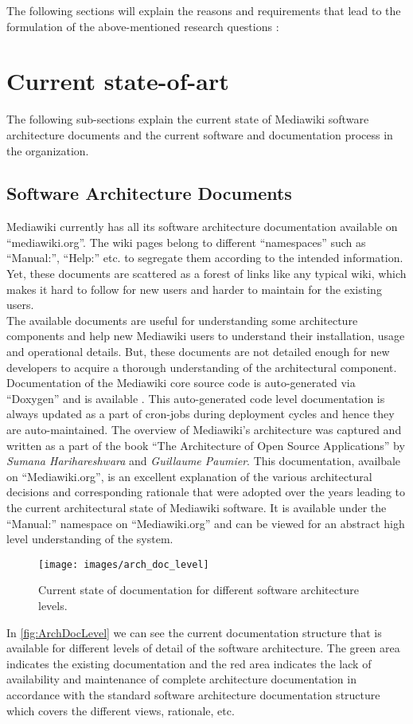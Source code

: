 The following sections will explain the reasons and requirements that lead to the formulation of the above-mentioned research questions : 
 
\section{Current state-of-art}\label{CurrentSOA} 
\indent The following sub-sections explain the current state of Mediawiki software architecture documents and the current software and documentation process in the organization.
\subsection{Software Architecture Documents}
\indent Mediawiki currently has all its software architecture documentation available on \enquote{mediawiki.org}. The wiki pages belong to different \enquote{namespaces} such as \enquote{Manual:}, \enquote{Help:} etc. to segregate them according to the intended information. Yet, these documents are scattered as a forest of links like any typical wiki, which makes it hard to follow for new users and harder to maintain for the existing users. 
\\\indent The available documents are useful for understanding some architecture components and help new Mediawiki users to understand their installation, usage and operational details. But, these documents are not detailed enough for new developers to acquire a thorough understanding of the architectural component.  Documentation of the Mediawiki core source code is auto-generated via \enquote{Doxygen} and is available \cite{mw_core}. This auto-generated code level documentation is always updated as a part of cron-jobs during deployment cycles and hence they are auto-maintained. The overview of Mediawiki's architecture was captured and written as a part of the book \enquote{The Architecture of Open Source Applications} by \emph{Sumana Harihareshwara} and \emph{Guillaume Paumier}. This documentation, availbale on \enquote{Mediawiki.org}, is an excellent explanation of the various architectural decisions and corresponding rationale that were adopted over the years leading to the current architectural state  of Mediawiki software. It is available under the \enquote{Manual:} namespace on \enquote{Mediawiki.org} and can be viewed for an abstract high level understanding of the system.
\begin{figure}[H]
  \centering
  \texttt{[image: images/arch\_doc\_level]}
  \caption[Documentation available for software architecture levels]{Current state of documentation for different software architecture levels.}\label{fig:ArchDocLevel}
\end{figure}
\indent In \autoref{fig:ArchDocLevel}  we can see the current documentation structure that is available for different levels of detail of the software architecture. The green area indicates the existing documentation and the red area indicates the lack of availability and maintenance of complete architecture documentation in accordance with the standard software architecture documentation structure \cite{BachmannDocumentingSoftware2010} which covers the different views, rationale,  etc.

